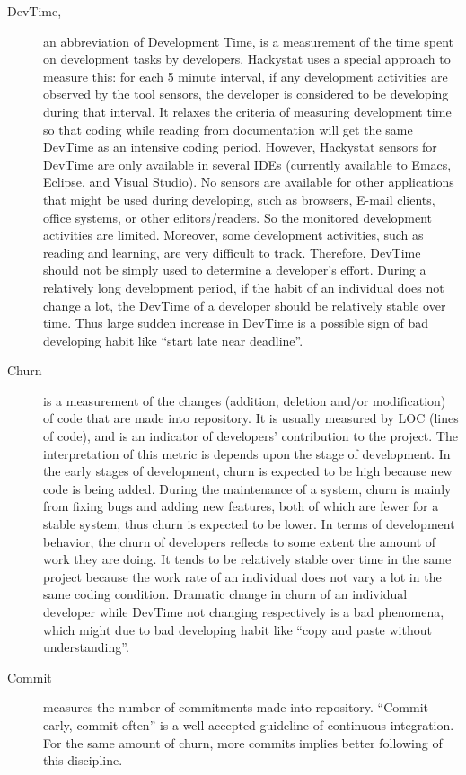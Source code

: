 \begin{description}
\item[DevTime,] an abbreviation of Development Time, is a measurement of the time spent on development tasks by developers. Hackystat uses a special approach to measure this: for each 5 minute interval, if any development activities are observed by the tool sensors, the developer is considered to be developing during that interval. It relaxes the criteria of measuring development time so that coding while reading from documentation will get the same DevTime as an intensive coding period. However, Hackystat sensors for DevTime are only available in several IDEs (currently available to Emacs, Eclipse, and Visual Studio). No sensors are available for other applications that might be used during developing, such as browsers, E-mail clients, office systems, or other editors/readers. So the monitored development activities are limited. Moreover, some development activities, such as reading and learning, are very difficult to track. Therefore, DevTime should not be simply used to determine a developer's effort. During a relatively long development period, if the habit of an individual does not change a lot, the DevTime of a developer should be relatively stable over time. Thus large sudden increase in DevTime is a possible sign of bad developing habit like ``start late near deadline''.

\item[Churn] 
is a measurement of the changes (addition, deletion and/or modification) of code that are made into repository. It is usually measured by LOC (lines of code), and is an indicator of developers' contribution to the project. The interpretation of this metric is depends upon the stage of development. In the early stages of development, churn is expected to be high because new code is being added. During the maintenance of a system, churn is mainly from fixing bugs and adding new features, both of which are fewer for a stable system, thus churn is expected to be lower. In terms of development behavior, the churn of developers reflects to some extent the amount of work they are doing. It tends to be relatively stable over time in the same project because the work rate of an individual does not vary a lot in the same coding condition. Dramatic change in churn of an individual developer while DevTime not changing respectively is a bad phenomena, which might due to bad developing habit like ``copy and paste without understanding''.

\item[Commit] 
measures the number of commitments made into repository. ``Commit early, commit often'' is a well-accepted guideline of continuous integration\cite{continuousintegration}. For the same amount of churn, more commits implies better following of this discipline.


\end{description}
